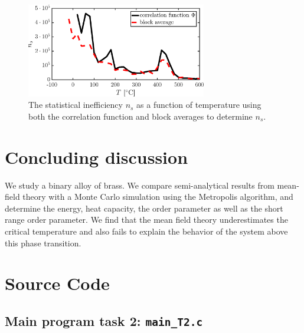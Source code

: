 \begin{figure}[!ht]
\begin{center}
  \includegraphics[width=0.7\textwidth]{../figures/stat_inefficiency_both} 
  \caption{The statistical inefficiency $n_s$ as a function of temperature using both the correlation function and block averages to determine $n_s$.}
  \label{fig:ns_both}
\end{center}
\end{figure}
\section*{Concluding discussion}
We study a binary alloy of brass. We compare semi-analytical results from mean-field theory with a Monte Carlo simulation using the Metropolis algorithm, and determine the energy, heat capacity, the order parameter as well as the short range order parameter. 
We find that the mean field theory underestimates the critical temperature and also fails to explain the behavior of the system above this phase transition. 
\newpage

\appendix

\section{Source Code}

%

%

\subsection{Main program task 2: \texttt{main\_T2.c}}



